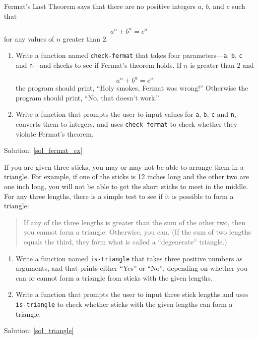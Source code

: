 \begin{exercise}
\label{fermat_ex}

Fermat's Last Theorem says that there are no positive integers
$a$, $b$, and $c$ such that

\[ a^n + b^n = c^n \]
%
for any values of $n$ greater than 2.

\begin{enumerate}

\item Write a function named \verb"check-fermat" that takes four
parameters---{\tt a}, {\tt b}, {\tt c} and {\tt n}---and
checks to see if Fermat's theorem holds.  If
$n$ is greater than 2 and 

\[a^n + b^n = c^n \]
%
the program should print, ``Holy smokes, Fermat was wrong!''
Otherwise the program should print, ``No, that doesn't work.''

\item Write a function that prompts the user to input values
for {\tt a}, {\tt b}, {\tt c} and {\tt n}, converts them to
integers, and uses \verb"check-fermat" to check whether they
violate Fermat's theorem.
\end{enumerate}

Solution: \ref{sol_fermat_ex}


\end{exercise}


\begin{exercise}
\label{triangle}

If you are given three sticks, you may or may not be able to arrange
them in a triangle.  For example, if one of the sticks is 12 inches
long and the other two are one inch long, you will
not be able to get the short sticks to meet in the middle.  For any
three lengths, there is a simple test to see if it is possible 
to form a triangle:

\begin{quotation}
If any of the three lengths is greater than the sum of the other
  two, then you cannot form a triangle.  Otherwise, you
  can.  (If the sum of two lengths equals the third, they form
    what is called a ``degenerate'' triangle.)
\end{quotation}

\begin{enumerate}

\item Write a function named \verb"is-triangle" that takes three
positive numbers as arguments, and that prints either 
``Yes'' or ``No'', depending on whether you can or cannot 
form a triangle from sticks with the given lengths.

\item Write a function that prompts the user to input 
three stick lengths and uses \verb"is-triangle" to check 
whether sticks with the given lengths can form a triangle.

\end{enumerate}

Solution: \ref{sol_triangle}


\end{exercise}

